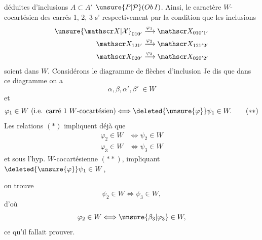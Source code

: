 déduites d'inclusions $A\subset A'$  $\unsure{P|\mathcal P}(Ob\,I)$. Ainsi, le caractère $W$-cocartésien des carrés 1, 2, 3 s' respectivement par la condition que les inclusions
\[
 \begin{aligned}
 \unsure{\mathscr X|\mathcal X}_{010'}&\xrightarrow{\varphi_1}\mathscr X_{010'1'}\\
 \mathscr X_{121'}&\xrightarrow{\varphi_2}\mathscr X_{121'2'}\\
 \mathscr X_{020'}&\xrightarrow{\varphi_3}\mathscr X_{020'2'}
 \end{aligned}
\]
soient dans $W$. Considérons  le diagramme de flèches d'inclusion
Je dis que dans ce diagramme on a
\[
 \alpha,\beta,\alpha',\beta'\ \in W \tag*{$(*)$}
\]
et
\[
 \varphi_1\in W\ \text{(i.e. carré 1 $W$-cocartésien)}
 \Longleftrightarrow\deleted{\unsure{\varphi}}\psi_1\in W. \tag*{$(**)$}
\]
Les relations $(*)$ impliquent déjà que
\[
 \begin{aligned}
 \varphi_2\in W&\Longleftrightarrow\psi_2\in W\\
 \varphi_3\in W&\Longleftrightarrow\psi_3\in W
 \end{aligned}
\]
et sous l'hyp. $W$-cocartésienne $(**)$, impliquant $\deleted{\unsure{\varphi}}\psi_1\in W$,



on trouve
\[
 \psi_2\in W\Longleftrightarrow\psi_3\in W,
\]
d'où
\[
 \varphi_2\in W\Longleftrightarrow\unsure{\beta_3|\varphi_3}\in W,
\]
ce qu'il fallait prouver.

